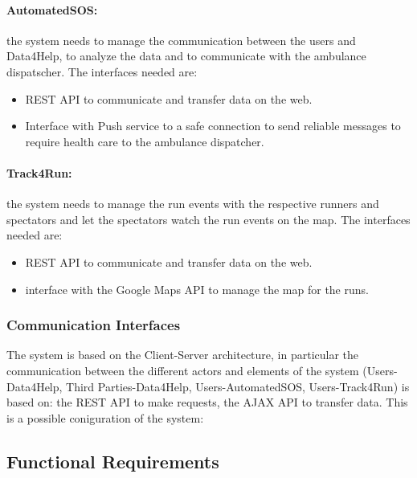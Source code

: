 \documentclass[a4paper]{article}
\begin{document}
    \paragraph{AutomatedSOS:} the system needs to manage the communication between the users and Data4Help, to analyze the data and to communicate with the ambulance dispatscher. The interfaces needed are:
    
    \begin{itemize}
        \item REST API to communicate and transfer data on the web.
        \item Interface with Push service to a safe connection to send reliable messages to require health care to the ambulance dispatcher.
    \end{itemize}
    
    \paragraph{Track4Run:} the system needs to manage the run events with the respective runners and spectators and let the spectators watch the run events on the map. The interfaces needed are:
    
    \begin{itemize}
        \item REST API to communicate and transfer data on the web.
        \item interface with the Google Maps API to manage the map for the runs.
    \end{itemize}
    
    
    \subsubsection{Communication Interfaces}
    
    The system is based on the Client-Server architecture, in particular the communication between the different actors and elements of the system (Users-Data4Help, Third Parties-Data4Help, Users-AutomatedSOS, Users-Track4Run) is based on: the REST API to make requests, the AJAX API to transfer data.
    This is a possible coniguration of the system:
    
    \subsection{Functional Requirements}
    
\end{document}
